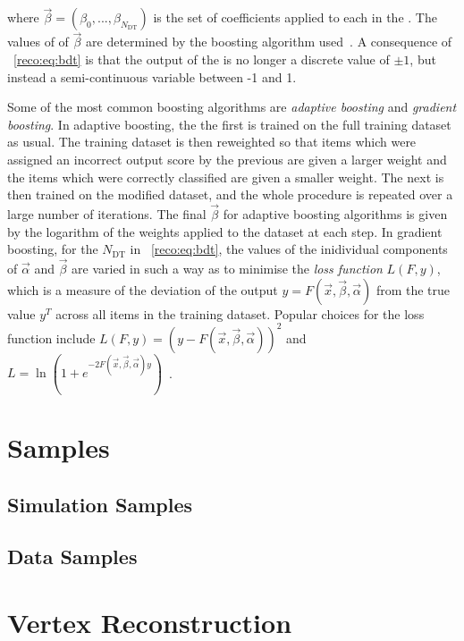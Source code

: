 where $\vec{\beta}=(\beta_{0},...,\beta_{N_{\textrm{DT}}})$ is the set of coefficients applied to each \DT in the \BDT. The values of of $\vec{\beta}$ are determined by the boosting algorithm used~\cite{friedman2009,TMVA}. A consequence of \Eq~\ref{reco:eq:bdt} is that the output of the \BDT is no longer a discrete value of $\pm1$, but instead a semi-continuous variable between -1 and 1. 

Some of the most common boosting algorithms are \emph{adaptive boosting} and \emph{gradient boosting}. In adaptive boosting, the the first \DT is trained on the full training dataset as usual. The training dataset is then reweighted so that items which were assigned an incorrect output score by the previous \DT are given a larger weight and the items which were correctly classified are given a smaller weight. The next \DT is then trained on the modified dataset, and the whole procedure is repeated over a large number of iterations. The final $\vec{\beta}$ for adaptive boosting algorithms is given by the logarithm of the weights applied to the dataset at each step. In gradient boosting, for the $N_{\textrm{DT}}$ \DT\s in \Eq~\ref{reco:eq:bdt}, the values of the inidividual components of $\vec{\alpha}$ and $\vec{\beta}$ are varied in such a way as to minimise the \emph{loss function} $L(F,y)$, which is a measure of the deviation of the \BDT output $y = F(\vec{x},\vec{\beta},\vec{\alpha})$ from the true value $y^T$ across all items in the training dataset. Popular choices for the loss function include $L(F,y) = ( y - F(\vec{x},\vec{\beta},\vec{\alpha}))^2$ and  $L = \ln (1 + e^{-2F(\vec{x},\vec{\beta},\vec{\alpha})y})$~\cite{friedman2009,TMVA}.



\section{Samples}
\label{reco:sec:samples}
\subsection{Simulation Samples}
\subsection{Data Samples} %

\section{Vertex Reconstruction}
\label{reco:sec:vertex}
